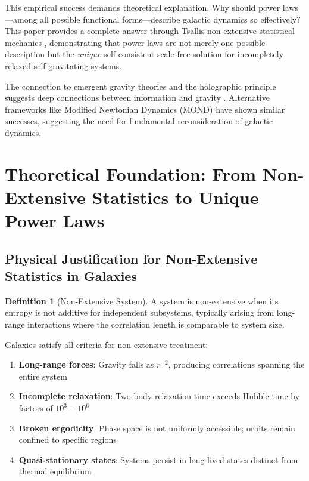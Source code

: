 \documentclass[12pt, a4paper]{article}
\theoremstyle{definition}
\newtheorem{definition}{Definition}
\theoremstyle{remark}
\begin{document}
This empirical success demands theoretical explanation. Why should power laws—among all possible functional forms—describe galactic dynamics so effectively? This paper provides a complete answer through Tsallis non-extensive statistical mechanics \cite{Tsallis1988}, demonstrating that power laws are not merely one possible description but the \textit{unique} self-consistent scale-free solution for incompletely relaxed self-gravitating systems.

The connection to emergent gravity theories \cite{Verlinde2011, Jacobson1995, Padmanabhan2010} and the holographic principle \cite{Bekenstein1973, Hawking1975, Susskind1995} suggests deep connections between information and gravity \cite{Wheeler1990, Zurek2003}. Alternative frameworks like Modified Newtonian Dynamics (MOND) \cite{Milgrom1983, Famaey2012} have shown similar successes, suggesting the need for fundamental reconsideration of galactic dynamics.

\section{Theoretical Foundation: From Non-Extensive Statistics to Unique Power Laws}

\subsection{Physical Justification for Non-Extensive Statistics in Galaxies}

\begin{definition}[Non-Extensive System]
A system is non-extensive when its entropy is not additive for independent subsystems, typically arising from long-range interactions where the correlation length is comparable to system size.
\end{definition}

Galaxies satisfy all criteria for non-extensive treatment:
\begin{enumerate}
\item \textbf{Long-range forces}: Gravity falls as $r^{-2}$, producing correlations spanning the entire system
\item \textbf{Incomplete relaxation}: Two-body relaxation time exceeds Hubble time by factors of $10^3-10^6$ \cite{Binney2008}
\item \textbf{Broken ergodicity}: Phase space is not uniformly accessible; orbits remain confined to specific regions
\item \textbf{Quasi-stationary states}: Systems persist in long-lived states distinct from thermal equilibrium \cite{Lynden-Bell1967}
\end{enumerate}
\end{document}
